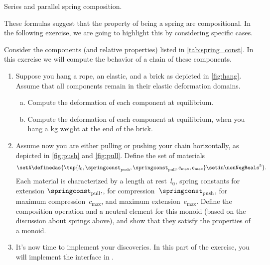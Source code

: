\begin{marginfigure}
    \centering
    \hspace{1cm}
    \caption{Series and parallel spring composition.}
    \label{fig:springs}
\end{marginfigure}

These formulas suggest that the property of being a spring are compositional.
In the following exercise, we are going to highlight this by considering specific cases.

\begin{gradedexercise}
    \label{ex:Goldberg}
    Consider the components (and relative properties) listed in \cref{tab:spring_const}.
    In this exercise we will compute the behavior of a chain of these components.
    \begin{enumerate}
        \item Suppose you hang a rope, an elastic, and a brick as depicted in \cref{fig:hang}.
              Assume that all components remain in their elastic deformation domains.
              \begin{enumerate}[(a)]
                  \item Compute the deformation of each component at equilibrium.
                  \item Compute the deformation of each component at equilibrium, when you hang a \unit[1]{kg} weight at the end of the brick.
              \end{enumerate}
        \item Assume now you are either pulling or pushing your chain horizontally, as depicted in \cref{fig:push} and \cref{fig:pull}.
              Define the set of materials~
              \begin{equation}
                  \setA\definedas \{ \tup{l_0, \springconst_\mathrm{push},\springconst_\mathrm{pull}, c_\mathrm{max}, e_\mathrm{max}} \setin \nonNegReals^5\}.
              \end{equation}
              Each material is characterized by a length at rest~$l_0$, spring constants for extension $\springconst_\mathrm{pull},$, for compression~$\springconst_\mathrm{push}$, for maximum compression~$c_\mathrm{max}$, and maximum extension~$e_\mathrm{max}$.
              Define the composition operation and a neutral element for this monoid (based on the discussion about springs above), and show that they satisfy the properties of a monoid.
        \item It's now time to implement your discoveries.
              In this part of the exercise, you will implement the interface in .


\end{enumerate}
\end{gradedexercise}
